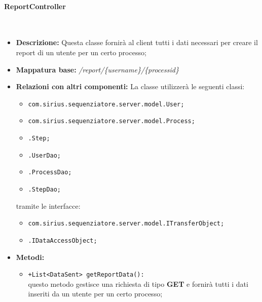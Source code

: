 \paragraph{ReportController}%
\
\begin{itemize}
	\item \textbf{Descrizione: } Questa classe fornirà al client tutti i dati necessari per creare il report di un utente per un certo processo;
	\item \textbf{Mappatura base: } \textit{\slash report\slash \{username\}\slash \{processid\}}
	\item \textbf{Relazioni con altri componenti: }
	La classe utilizzerà le seguenti classi:
	\begin{itemize}
		\item \texttt{com.sirius.sequenziatore.server.model.User;}
		\item \texttt{com.sirius.sequenziatore.server.model.Process;}
		\item \texttt{\sModel .Step;}
		\item \texttt{\sModel .UserDao;}
		\item \texttt{\sModel .ProcessDao;}
		\item \texttt{\sModel .StepDao;}
		
	\end{itemize}
	tramite le interfacce:
	\begin{itemize}
		\item \texttt{com.sirius.sequenziatore.server.model.ITransferObject;}
		\item \texttt{\sModel .IDataAccessObject;}
	\end{itemize}
	\item \textbf{Metodi: }\begin{itemize}
					\item \texttt{+List<DataSent> getReportData():}\\
					questo metodo gestisce una richiesta di tipo \textbf{GET} e fornirà tutti i dati inseriti da un utente per un certo processo;
				\end{itemize}
\end{itemize}